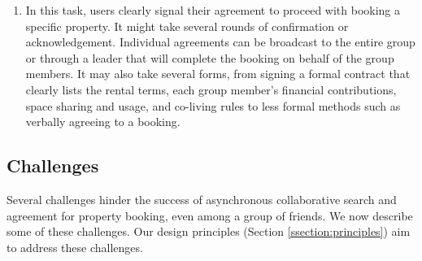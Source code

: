 \begin{enumerate}[label={}, leftmargin=0cm, itemindent=0.2cm]
\item \tAgreement  In this task, users clearly signal their agreement to proceed with booking a specific property. It might take several rounds of confirmation or acknowledgement. Individual agreements can be broadcast to the entire group or through a leader that will complete the booking on behalf of the group members. It may also take several forms, from signing a formal contract that clearly lists the rental terms, each group member's financial contributions, space sharing and usage, and co-living rules to less formal methods such as verbally agreeing to a booking.

\end{enumerate}

\subsection {Challenges}
\label{ssection:challenges}


Several challenges hinder the success of asynchronous collaborative search and agreement for property booking, even among a group of friends. We now describe some of these challenges. Our design principles (Section \ref{ssection:principles}) aim to address these challenges.

